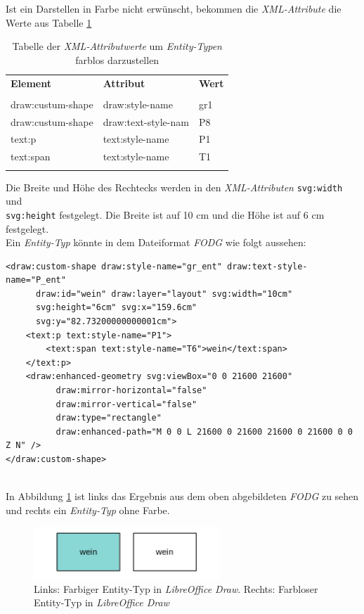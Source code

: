 \noindent
Ist ein Darstellen in Farbe nicht erwünscht, bekommen die \textit{XML-Attribute} die Werte aus Tabelle \ref{tbl:beispieltabelle2}

\begin{table}[H]
	\centering
	\begin{tabular}{lll}
		\textbf{Element} & \textbf{Attribut}  & \textbf{Wert} \\
		\\
		draw:custum-shape & draw:style-name           & gr1             \\
		draw:custum-shape & draw:text-style-nam      & P8             \\
		text:p & text:style-name       & P1             \\
		text:span & text:style-name       & T1             \\
		\\
	\end{tabular}
	
	\caption{Tabelle der \textit{XML-Attributwerte} um \textit{Entity-Typen} farblos darzustellen}
	\label{tbl:beispieltabelle2}
	
\end{table}

\noindent
Die Breite und Höhe des Rechtecks werden in den \textit{XML-Attributen} \verb|svg:width| und \\ \verb|svg:height| festgelegt. Die Breite ist auf 10 cm und die Höhe ist auf 6 cm festgelegt.
\\
\noindent
Ein \textit{Entity-Typ} könnte in dem Dateiformat \textit{FODG} wie folgt aussehen:
\begin{verbatim}
<draw:custom-shape draw:style-name="gr_ent" draw:text-style-name="P_ent" 
      draw:id="wein" draw:layer="layout" svg:width="10cm" 
      svg:height="6cm" svg:x="159.6cm" 
      svg:y="82.73200000000001cm">
    <text:p text:style-name="P1">
        <text:span text:style-name="T6">wein</text:span>
    </text:p>
    <draw:enhanced-geometry svg:viewBox="0 0 21600 21600" 
          draw:mirror-horizontal="false" 
          draw:mirror-vertical="false" 
          draw:type="rectangle" 
          draw:enhanced-path="M 0 0 L 21600 0 21600 21600 0 21600 0 0 Z N" />
</draw:custom-shape>
\end{verbatim}
\noindent
\hon{}
\\
\noindent
In Abbildung \ref{ergebnis7} ist links das Ergebnis aus dem oben abgebildeten \textit{FODG} zu sehen und rechts ein \textit{Entity-Typ} ohne Farbe.
\begin{figure}[H]
	\centering
	\includegraphics[width=7cm]{images/13.png}
	\caption{Links: Farbiger Entity-Typ in \textit{LibreOffice Draw}. Rechts: Farbloser Entity-Typ in \textit{LibreOffice Draw}}
	\label{ergebnis7}
\end{figure}
\noindent


